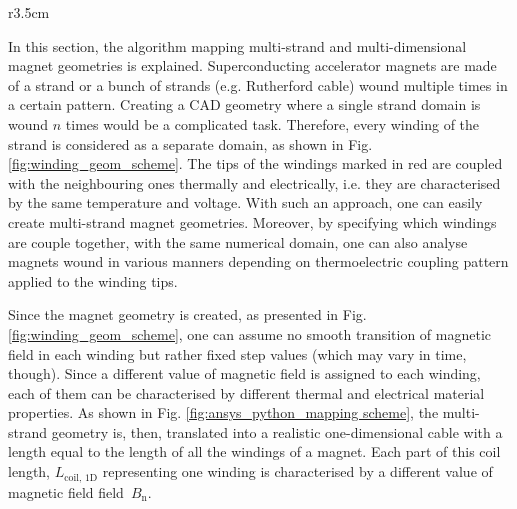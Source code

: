 
\begin{wrapfigure}{r}{3.5cm}
\centering
{}
\caption{Domain representation with multiple windings}
\label{fig:winding_geom_scheme}
\end{wrapfigure} 

In this section, the algorithm mapping multi-strand and multi-dimensional magnet geometries is explained. Superconducting accelerator magnets are made of a strand or a bunch of strands (e.g. Rutherford cable) wound multiple times in a certain pattern. Creating a CAD geometry where a single strand domain is wound $n$ times would be a complicated task. Therefore, every winding of the strand is considered as a separate domain, as shown in Fig. \ref{fig:winding_geom_scheme}. The tips of the windings marked in red are coupled with the neighbouring ones thermally and electrically, i.e. they are characterised by the same temperature and voltage. With such an approach, one can easily create multi-strand magnet geometries. Moreover, by specifying which windings are couple together, with the same numerical domain, one can also analyse magnets wound in various manners depending on thermoelectric coupling pattern applied to the winding tips. 

Since the magnet geometry is created, as presented in Fig. \ref{fig:winding_geom_scheme}, one can assume no smooth transition of magnetic field in each winding but rather fixed step values (which may vary in time, though). Since a different value of magnetic field is assigned to each winding, each of them can be characterised by different thermal and electrical material properties. As shown in Fig. \ref{fig:ansys_python_mapping scheme}, the multi-strand geometry is, then, translated into a realistic one-dimensional cable with a length equal to the length of all the windings of a magnet. Each part of this coil length, $L_\text{coil, 1D}$ representing one winding is characterised by a different value of magnetic field field~$B_\text{n}$.

